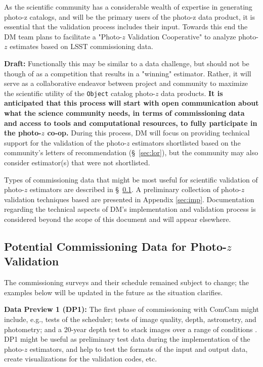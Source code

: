 \documentclass[DM,lsstdraft,toc]{lsstdoc}
\begin{document}
As the scientific community has a considerable wealth of expertise in generating photo-z catalogs, and will be the primary users of the photo-z data product, it is essential that the validation process includes their input.
Towards this end the DM team plans to facilitate a "Photo-$z$ Validation Cooperative" to analyze photo-$z$ estimates based on LSST commissioning data.

\textbf{Draft:} Functionally this may be similar to a data challenge, but should not be though of as a competition that results in a "winning" estimator.
Rather, it will serve as a collaborative endeavor between project and community to maximize the scientific utility of the {\tt Object} catalog photo-$z$ data products.
{\bf It is anticipated that this process will start with open communication about what the science community needs, in terms of commissioning data and access to tools and computational resources, to fully participate in the photo-$z$ co-op.}
During this process, DM will focus on providing technical support for the validation of the photo-$z$ estimators shortlisted based on the community's letters of recommendation (\S~\ref{sec:lor}), but the community may also consider estimator(s) that were not shortlisted.

Types of commissioning data that might be most useful for scientific validation of photo-$z$ estimators are described in \S~\ref{ssec:pzcoop_commissioning}.
A preliminary collection of photo-$z$ validation techniques based are presented in Appendix \ref{sec:imp}.
Documentation regarding the technical aspects of DM's implementation and validation process is considered beyond the scope of this document and will appear elsewhere.

\subsection{Potential Commissioning Data for Photo-$z$ Validation}\label{ssec:pzcoop_commissioning}

The commissioning surveys and their schedule remained subject to change; the examples below will be updated in the future as the situation clarifies.

{\bf Data Preview 1 (DP1):} The first phase of commissioning with ComCam might include, e.g., tests of the scheduler; tests of image quality, depth, astrometry, and photometry; and a 20-year depth test to stack images over a range of conditions .
DP1 might be useful as preliminary test data during the implementation of the photo-$z$ estimators, and help to test the formats of the input and output data, create visualizations for the validation codes, etc.
\end{document}
